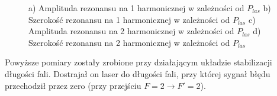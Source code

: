 \documentclass[a4paper,10pt]{article}
\begin{document}
\begin{figure}[h!]
\centering
{}

\caption{ a) Amplituda rezonansu na 1 harmonicznej w zależności od $P_{las}$ b) Szerokość rezonansu na 1 harmonicznej w zależności od $P_{las}$ 
c) Amplituda rezonansu na 2 harmonicznej w zależności od $P_{las}$ d) Szerokość rezonansu na 2 harmonicznej w zależności od $P_{las}$}
\label{wykresikiodP}
\end{figure}

Powyższe pomiary zostały zrobione przy działającym układzie stabilizacji długości fali. Dostrajał on laser do długości fali, przy której sygnał błędu przechodził przez zero (przy przejściu $F=2 \rightarrow F'=2$).
\end{document}
